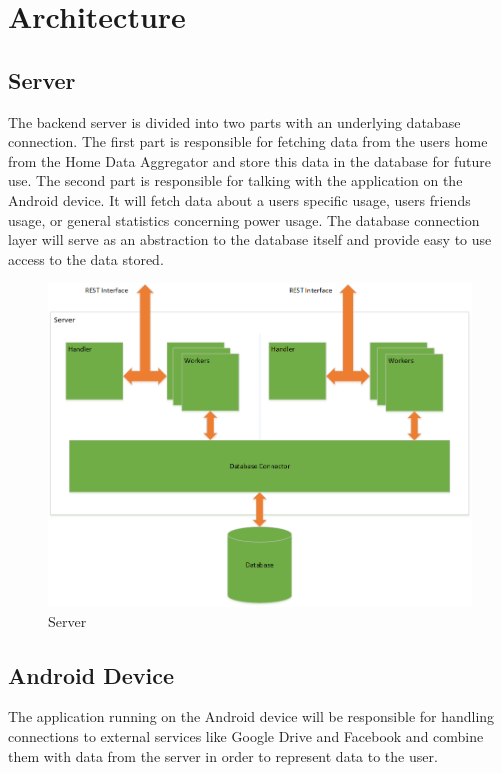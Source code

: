 \section{Architecture}
\subsection{Server}
The backend server is divided into two parts with an underlying database connection. The first part is responsible for fetching data from the users home from the Home Data Aggregator and store this data in the database for future use. The second part is responsible for talking with the application on the Android device. It will fetch data about a users specific usage, users friends usage, or general statistics concerning power usage. The database connection layer will serve as an abstraction to the database itself and provide easy to use access to the data stored.

\begin{figure}[H]
\includegraphics[width=\textwidth]{ch/projectPlan/fig/server.png}
\caption{Server}
\end{figure}

\subsection{Android Device}
The application running on the Android device will be responsible for handling connections to external services like Google Drive and Facebook and combine them with data from the server in order to represent data to the user.

